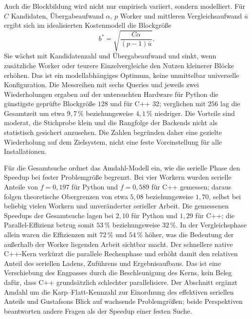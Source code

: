\documentclass[a4paper,12pt, twoside]{report}
\theoremstyle{definition}
\begin{document}
Auch die Blockbildung wird nicht nur empirisch variiert, sondern modelliert. Für $C$ Kandidaten, Übergabeaufwand $\alpha$, $p$ Worker und mittleren Vergleichsaufwand $\bar u$ ergibt sich im idealisierten Kostenmodell die Blockgröße
\[
b^\ast=\sqrt{\frac{C\alpha}{(p-1)\bar u}}.
\]
Sie wächst mit Kandidatenzahl und Übergabeaufwand und sinkt, wenn zusätzliche Worker oder teurere Einzelvergleiche den Nutzen kleinerer Blöcke erhöhen. Das ist ein modellabhängiges Optimum, keine unmittelbar universelle Konfiguration. Die Messreihen mit sechs Queries und jeweils zwei Wiederholungen ergaben auf der untersuchten Hardware für Python die günstigste geprüfte Blockgröße $128$ und für C++ $32$; verglichen mit $256$ lag die Gesamtzeit um etwa $9{,}7\,\%$ beziehungsweise $4{,}1\,\%$ niedriger. Die Vorteile sind moderat, die Stichprobe klein und die Rangfolge der Backends nicht als statistisch gesichert anzusehen. Die Zahlen begründen daher eine gezielte Wiederholung auf dem Zielsystem, nicht eine feste Voreinstellung für alle Installationen.

Für die Gesamtsuche ordnet das Amdahl-Modell ein, wie die serielle Phase den Speedup bei fester Problemgröße begrenzt. Bei vier Workern wurden serielle Anteile von $f=0{,}197$ für Python und $f=0{,}589$ für C++ gemessen; daraus folgen theoretische Obergrenzen von etwa $5{,}08$ beziehungsweise $1{,}70$, selbst bei beliebig vielen Workern und unveränderter serieller Arbeit. Die gemessenen Speedups der Gesamtsuche lagen bei $2{,}10$ für Python und $1{,}29$ für C++; die Parallel-Effizienz betrug somit $53\,\%$ beziehungsweise $32\,\%$. In der Vergleichsphase allein waren die Effizienzen mit $72\,\%$ und $54\,\%$ höher, was die Bedeutung der außerhalb der Worker liegenden Arbeit sichtbar macht. Der schnellere native C++-Kern verkürzt die parallele Rechenphase und erhöht damit den relativen Anteil des seriellen Ladens, Zuführens und Ergebnisaufbaus. Das ist eine Verschiebung des Engpasses durch die Beschleunigung des Kerns, kein Beleg dafür, dass C++ grundsätzlich schlechter parallelisiere. Der Abschnitt ergänzt Amdahl um die Karp--Flatt-Kennzahl zur Einordnung des effektiven seriellen Anteils und Gustafsons Blick auf wachsende Problemgrößen; beide Perspektiven beantworten andere Fragen als der Speedup einer festen Suche.
\end{document}
